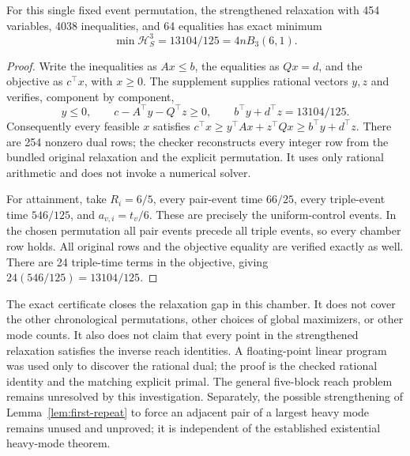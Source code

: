 \begin{proposition}
\label{prop:chronological-chamber}
For this single fixed event permutation, the strengthened relaxation with
454 variables, 4038 inequalities, and 64 equalities has exact minimum
\[
 \min\mathcal H_S^3=13104/125=4nB_3(6,1).
\]
\end{proposition}
\begin{proof}
Write the inequalities as $Ax\le b$, the equalities as $Qx=d$, and
the objective as $c^\top x$, with $x\ge0$. The supplement supplies
rational vectors $y,z$ and verifies, component by component,
\[
 y\le0,\qquad c-A^\top y-Q^\top z\ge0,\qquad
 b^\top y+d^\top z=13104/125.
\]
Consequently every feasible $x$ satisfies
$c^\top x\ge y^\top Ax+z^\top Qx\ge b^\top y+d^\top z$.
There are 254 nonzero dual rows; the checker reconstructs every integer
row from the bundled original relaxation and the explicit permutation.
It uses only rational arithmetic and does not invoke a numerical solver.

For attainment, take $R_i=6/5$, every pair-event time $66/25$, every
triple-event time $546/125$, and $a_{v,i}=t_v/6$. These are precisely the
uniform-control events. In the chosen permutation all pair events precede
all triple events, so every chamber row holds. All original rows and the
objective equality are verified exactly as well. There are 24 triple-time
terms in the objective, giving $24(546/125)=13104/125$.
\end{proof}

The exact certificate closes the relaxation gap in this chamber. It does
not cover the other chronological permutations, other choices of global
maximizers, or other mode counts. It also does not claim that every point
in the strengthened relaxation satisfies the inverse reach identities.
A floating-point linear program was used only to discover the rational
dual; the proof is the checked rational identity and the matching explicit
primal. The general five-block reach problem remains unresolved by this
investigation. Separately, the possible strengthening of
Lemma~\ref{lem:first-repeat} to force an adjacent pair of a largest heavy
mode remains unused and unproved; it is independent of the established
existential heavy-mode theorem.
